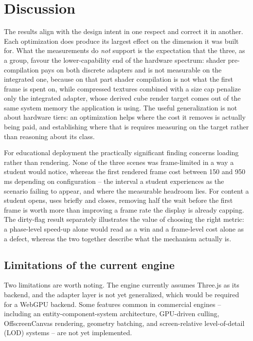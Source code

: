 \section{Discussion}
\label{sec:discussion}
The results align with the design intent in one respect and correct it in another. Each optimization does produce its largest effect on the dimension it was built for. What the measurements do \emph{not} support is the expectation that the three, as a group, favour the lower-capability end of the hardware spectrum: shader pre-compilation pays on both discrete adapters and is not measurable on the integrated one, because on that part shader compilation is not what the first frame is spent on, while compressed textures combined with a size cap penalize only the integrated adapter, whose derived cube render target comes out of the same system memory the application is using. The useful generalization is not about hardware tiers: an optimization helps where the cost it removes is actually being paid, and establishing where that is requires measuring on the target rather than reasoning about its class.

For educational deployment the practically significant finding concerns loading rather than rendering. None of the three scenes was frame-limited in a way a student would notice, whereas the first rendered frame cost between 150 and 950 ms depending on configuration -- the interval a student experiences as the scenario failing to appear, and where the measurable headroom lies. For content a student opens, uses briefly and closes, removing half the wait before the first frame is worth more than improving a frame rate the display is already capping. The dirty-flag result separately illustrates the value of choosing the right metric: a phase-level speed-up alone would read as a win and a frame-level cost alone as a defect, whereas the two together describe what the mechanism actually is.

\subsection{Limitations of the current engine}
Two limitations are worth noting. The engine currently assumes Three.js as its backend, and the adapter layer is not yet generalized, which would be required for a WebGPU backend. Some features common in commercial engines -- including an entity-component-system architecture, GPU-driven culling, OffscreenCanvas rendering, geometry batching, and screen-relative level-of-detail (LOD) systems -- are not yet implemented.

